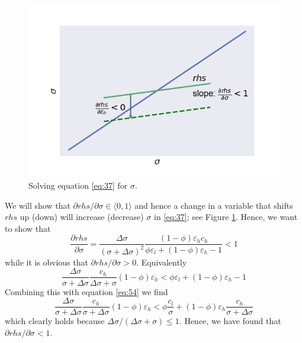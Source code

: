 \documentclass[a4paper,12pt]{article}
\begin{document}
\begin{figure}[htbp]
\centering
\includegraphics[width=.9\linewidth]{./fixedpoint.png}
\caption{\label{fig:fixedpoint}Solving equation \eqref{eq:37} for \(\sigma\).}
\end{figure}

We will show that \(\partial rhs/\partial \sigma \in \langle 0,1 \rangle\) and hence a change in a variable that shifts \(rhs\) up (down) will increase (decrease) \(\sigma\) in \eqref{eq:37}; see Figure \ref{fig:fixedpoint}. Hence, we want to show that
\begin{equation}
\label{eq:25}
\frac{\partial rhs}{\partial \sigma} = \frac{\Delta \sigma}{(\sigma+\Delta \sigma)^2} \frac{(1-\phi) \varepsilon_h c_h}{\phi \varepsilon_l + (1-\phi) \varepsilon_h -1} < 1
\end{equation}
while it is obvious that \(\partial rhs/\partial \sigma >0\). Equivalently
\begin{equation}
\label{eq:27}
\frac{\Delta \sigma}{\sigma + \Delta \sigma} \frac{c_h}{\Delta \sigma + \sigma}(1-\phi)\varepsilon_h < \phi \varepsilon_l + (1-\phi) \varepsilon_h -1
\end{equation}
Combining this with equation \eqref{eq:54} we find
\begin{equation}
\label{eq:30}
\frac{\Delta \sigma}{\sigma+\Delta \sigma}\frac{c_h}{\sigma+\Delta\sigma}(1-\phi)\varepsilon_h < \phi \frac{c_l}{\sigma}+(1-\phi)\varepsilon_h \frac{c_h}{\sigma+\Delta\sigma}
\end{equation}
which clearly holds because \(\Delta\sigma/(\Delta\sigma+\sigma) \leq 1\). Hence, we have found that \(\partial rhs/\partial \sigma < 1\).
\end{document}
